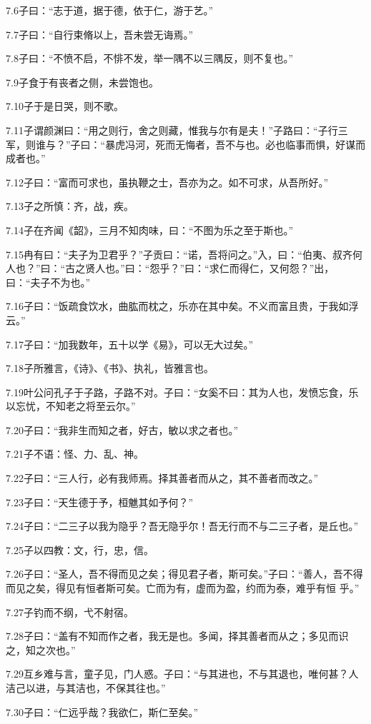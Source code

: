 \documentclass[a4paper,12pt,UTF8,twoside]{ctexbook}
\begin{document}
7.6子曰：“志于道，据于德，依于仁，游于艺。”

7.7子曰：“自行束脩以上，吾未尝无诲焉。”

7.8子曰：“不愤不启，不悱不发，举一隅不以三隅反，则不复也。”

7.9子食于有丧者之侧，未尝饱也。

7.10子于是日哭，则不歌。

7.11子谓颜渊曰：“用之则行，舍之则藏，惟我与尔有是夫！”子路曰：“子行三军，则谁与？”子曰：“暴虎冯河，死而无悔者，吾不与也。必也临事而惧，好谋而成者也。”

7.12子曰：“富而可求也，虽执鞭之士，吾亦为之。如不可求，从吾所好。”

7.13子之所慎：齐，战，疾。

7.14子在齐闻《韶》，三月不知肉味，曰：“不图为乐之至于斯也。”

7.15冉有曰：“夫子为卫君乎？”子贡曰：“诺，吾将问之。”入，曰：“伯夷、叔齐何人也？”曰：“古之贤人也。”曰：“怨乎？”曰：“求仁而得仁，又何怨？”出，曰：“夫子不为也。”

7.16子曰：“饭疏食饮水，曲肱而枕之，乐亦在其中矣。不义而富且贵，于我如浮云。”

7.17子曰：“加我数年，五十以学《易》，可以无大过矣。”

7.18子所雅言，《诗》、《书》、执礼，皆雅言也。

7.19叶公问孔子于子路，子路不对。子曰：“女奚不曰：其为人也，发愤忘食，乐以忘忧，不知老之将至云尔。”

7.20子曰：“我非生而知之者，好古，敏以求之者也。”

7.21子不语：怪、力、乱、神。

7.22子曰：“三人行，必有我师焉。择其善者而从之，其不善者而改之。”

7.23子曰：“天生德于予，桓魋其如予何？”

7.24子曰：“二三子以我为隐乎？吾无隐乎尔！吾无行而不与二三子者，是丘也。”

7.25子以四教：文，行，忠，信。

7.26子曰：“圣人，吾不得而见之矣；得见君子者，斯可矣。”子曰：“善人，吾不得而见之矣，得见有恒者斯可矣。亡而为有，虚而为盈，约而为泰，难乎有恒
乎。”

7.27子钓而不纲，弋不射宿。

7.28子曰：“盖有不知而作之者，我无是也。多闻，择其善者而从之；多见而识之，知之次也。”

7.29互乡难与言，童子见，门人惑。子曰：“与其进也，不与其退也，唯何甚？人洁己以进，与其洁也，不保其往也。”

7.30子曰：“仁远乎哉？我欲仁，斯仁至矣。”
\end{document}
